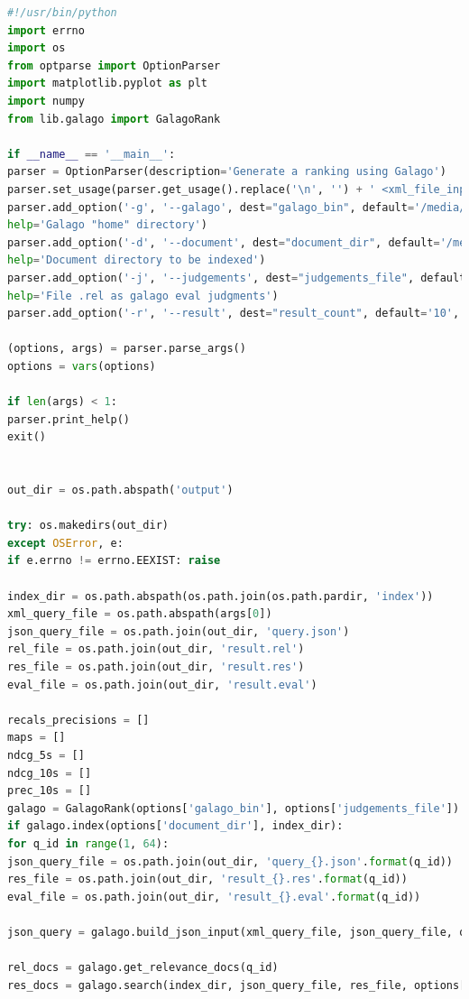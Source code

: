 \documentclass[letterpaper,11pt]{article}
\begin{document}
\begin{lstlisting}[language=python, caption={Code for question 8.5}, label={lst:85}]
#!/usr/bin/python
import errno
import os
from optparse import OptionParser
import matplotlib.pyplot as plt
import numpy
from lib.galago import GalagoRank

if __name__ == '__main__':
parser = OptionParser(description='Generate a ranking using Galago')
parser.set_usage(parser.get_usage().replace('\n', '') + ' <xml_file_input>')
parser.add_option('-g', '--galago', dest="galago_bin", default='/media/erikaris/DATA/ODU/Semester_3/intro_to_info_retrieval/galago/galago-3.10-bin/bin/galago',
help='Galago "home" directory')
parser.add_option('-d', '--document', dest="document_dir", default='/media/erikaris/DATA/ODU/Semester_3/intro_to_info_retrieval/assignments/a4/code-report/cacm',
help='Document directory to be indexed')
parser.add_option('-j', '--judgements', dest="judgements_file", default='/media/erikaris/DATA/ODU/Semester_3/intro_to_info_retrieval/assignments/a4/code-report/cacm.rel',
help='File .rel as galago eval judgments')
parser.add_option('-r', '--result', dest="result_count", default='10', help='Number of result')

(options, args) = parser.parse_args()
options = vars(options)

if len(args) < 1:
parser.print_help()
exit()


out_dir = os.path.abspath('output')

try: os.makedirs(out_dir)
except OSError, e:
if e.errno != errno.EEXIST: raise

index_dir = os.path.abspath(os.path.join(os.path.pardir, 'index'))
xml_query_file = os.path.abspath(args[0])
json_query_file = os.path.join(out_dir, 'query.json')
rel_file = os.path.join(out_dir, 'result.rel')
res_file = os.path.join(out_dir, 'result.res')
eval_file = os.path.join(out_dir, 'result.eval')

recals_precisions = []
maps = []
ndcg_5s = []
ndcg_10s = []
prec_10s = []
galago = GalagoRank(options['galago_bin'], options['judgements_file'])
if galago.index(options['document_dir'], index_dir):
for q_id in range(1, 64):
json_query_file = os.path.join(out_dir, 'query_{}.json'.format(q_id))
res_file = os.path.join(out_dir, 'result_{}.res'.format(q_id))
eval_file = os.path.join(out_dir, 'result_{}.eval'.format(q_id))

json_query = galago.build_json_input(xml_query_file, json_query_file, q_id)

rel_docs = galago.get_relevance_docs(q_id)
res_docs = galago.search(index_dir, json_query_file, res_file, options['result_count'])


\end{lstlisting}
\end{document}
